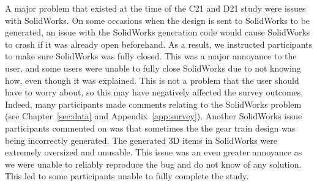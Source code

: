\begin{doublespace}
A major problem that existed at the time of the C21 and D21 study were issues with SolidWorks. On some occasions when the design is sent to SolidWorks to be generated, an issue with the SolidWorks generation code would cause SolidWorks to crash if it was already open beforehand. As a result, we instructed participants to make sure SolidWorks was fully closed. This was a major annoyance to the user, and some users were unable to fully close SolidWorks due to not knowing how, even though it was explained. This is not a problem that the user should have to worry about, so this may have negatively affected the survey outcomes. Indeed, many participants made comments relating to the SolidWorks problem (see Chapter~\ref{sec:data} and Appendix~\ref{app:survey}). Another SolidWorks issue participants commented on was that sometimes the the gear train design was being incorrectly generated. The generated 3D items in SolidWorks were extremely oversized and unusable. This issue was an even greater annoyance as we were unable to reliably reproduce the bug and do not know of any solution. This led to some participants unable to fully complete the study. 


\end{doublespace}

